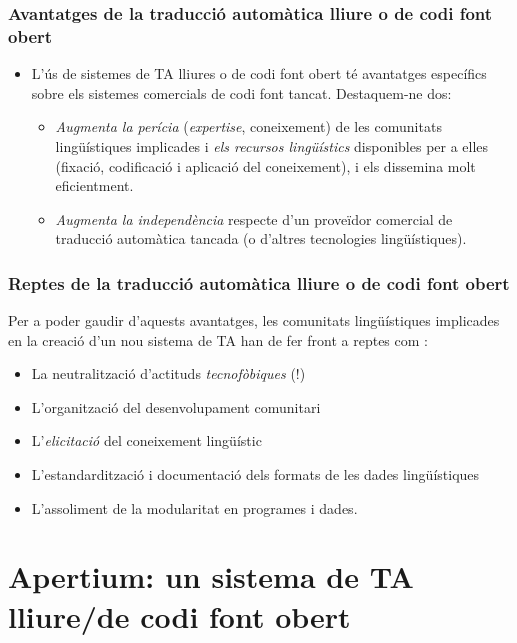 \documentclass{beamer}
\newcommand{\empha}[1]{\emph{#1}\/}
\begin{document}
\begin{frame}
\frametitle{Avantatges de la traducció automàtica lliure o de codi font obert}
\begin{itemize}
\item L'ús de sistemes de TA lliures o de codi font obert té
  avantatges específics sobre els sistemes comercials de codi font
  tancat.  Destaquem-ne dos:
 \begin{itemize}
 \item \empha{Augmenta la perícia} (\empha{expertise}, coneixement) de
   les comunitats lingüístiques implicades i \empha{els recursos
     lingüístics} disponibles per a elles (fixació, codificació i
   aplicació del coneixement), i els dissemina molt eficientment.
 \item \empha{Augmenta la independència} respecte d'un proveïdor
   comercial de traducció automàtica tancada (o d'altres tecnologies
   lingüístiques).
 \end{itemize}
\end{itemize}
\end{frame}



\begin{frame}
  \frametitle{Reptes de la traducció automàtica lliure o de codi font
    obert} Per a poder gaudir d'aquests avantatges, les comunitats
  lingüístiques implicades en la creació d'un nou sistema de TA han de
  fer front a reptes com :
  \begin{itemize}
  \item La neutralització d'actituds \empha{tecnofòbiques} (!)
  \item L'organització del desenvolupament comunitari
  \item L'\empha{elicitació} del coneixement lingüístic
  \item L'estandardització i documentació dels formats de les dades lingüístiques
  \item L'assoliment de la modularitat en  programes i dades.
  \end{itemize}

\end{frame}




\section{Apertium: un sistema de TA lliure/de codi font obert}
\end{document}
